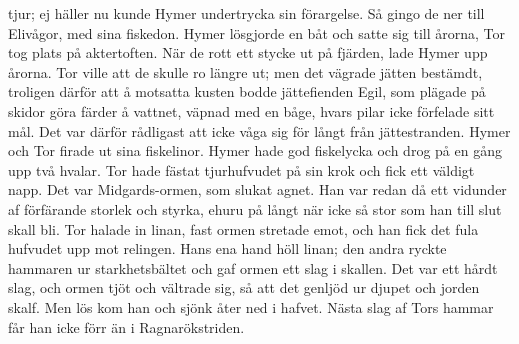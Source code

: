 tjur; ej häller nu kunde Hymer undertrycka sin förargelse. Så gingo de
ner till Elivågor, med sina fiskedon. Hymer lösgjorde en båt och satte
sig till årorna, Tor tog plats på aktertoften. När de rott ett stycke ut
på fjärden, lade Hymer upp årorna. Tor ville att de skulle ro längre ut;
men det vägrade jätten bestämdt, troligen därför att å motsatta kusten
bodde jättefienden Egil, som plägade på skidor göra färder å vattnet,
väpnad med en båge, hvars pilar icke förfelade sitt mål. Det var därför
rådligast att icke våga sig för långt från jättestranden. Hymer och Tor
firade ut sina fiskelinor. Hymer hade god fiskelycka och drog på en gång
upp två hvalar. Tor hade fästat tjurhufvudet på sin krok och fick ett
väldigt napp. Det var Midgards-ormen, som slukat agnet. Han var redan då
ett vidunder af förfärande storlek och styrka, ehuru
\protect\hypertarget{lb1625905.xhtmlux5cux23start50}{}{}\protect\hypertarget{lb1625905.xhtmlux5cux23start50-a}{}{}\protect\hypertarget{lb1625905.xhtmlux5cux23start50-b}{}{}\protect\hypertarget{lb1625905.xhtmlux5cux23start50-c}{}{}\protect\hypertarget{lb1625905.xhtmlux5cux23start50-d}{}{}
på långt när icke så stor som han till slut skall bli. Tor halade in
linan, fast ormen stretade emot, och han fick det fula hufvudet upp mot
relingen. Hans ena hand höll linan; den andra ryckte hammaren ur
starkhetsbältet och gaf ormen ett slag i skallen. Det var ett hårdt
slag, och ormen tjöt och vältrade sig, så att det genljöd ur djupet och
jorden skalf. Men lös kom han och sjönk åter ned i hafvet. Nästa slag af
Tors hammar får han icke förr än i Ragnarökstriden.

